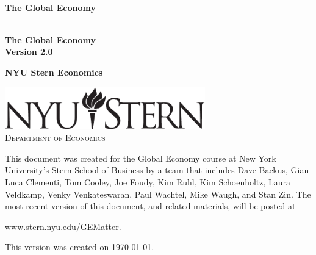 \begin{titlepage}

\begin{center}
\textsc{}\\[1.5in]
{\Huge\bf The Global Economy} \\ [0.5in]
\end{center}

\pagebreak
\phantom{x}
\thispagestyle{empty}

\pagebreak
\thispagestyle{empty}
\begin{center}
\textsc{}\\[1.5in]
{\Huge\bf The Global Economy} \\ [0.25in]
{\huge\bf Version 2.0}

\vspace*{1.00in}
{\huge\bf NYU Stern Economics}

\vfill
{\includegraphics[width=0.65\textwidth]{Figures/stern_logo3.pdf}\\
\textsc{\large Department of Economics}\\[1.5in]
}
\end{center}


\newpage
\thispagestyle{empty}
\phantom{x}
\vfill
This document was created for the Global Economy course at New York
University's Stern School of Business by a team that includes
Dave Backus, Gian Luca Clementi, Tom Cooley, Joe Foudy, Kim Ruhl,
Kim Schoenholtz, Laura Veldkamp, Venky Venkateswaran, Paul Wachtel, Mike Waugh,
and Stan Zin.
The most recent version of this document, and related materials,
will be posted at

\vspace*{\parskip}
\centerline{\url{www.stern.nyu.edu/GEMatter}.}

This version was created on \today.


\end{titlepage}
